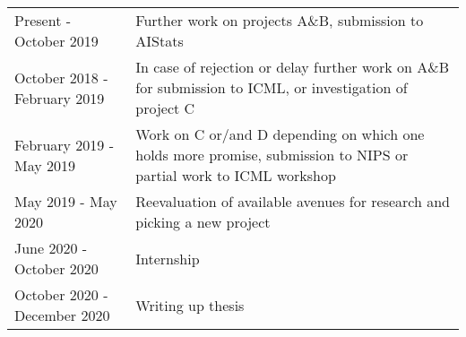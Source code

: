 \documentclass[12pt]{article}
\begin{document}
\begin{table}[h!]
\begin{tabular}{lp{11cm}}
Present - October 2019         & Further work on projects A\&B, submission to AIStats \\
October 2018 - February 2019   & In case of rejection or delay further work on A\&B for submission to ICML, or investigation of project C \\
February 2019 - May 2019       & Work on C or/and D depending on which one holds more promise, submission to NIPS or partial work to ICML workshop \\
May 2019 - May 2020            & Reevaluation of available avenues for research and picking a new project \\
June 2020 - October 2020       & Internship \\
October 2020 - December 2020   & Writing up thesis
\end{tabular}
\end{table}




\newpage 

 

% 
\end{document}
